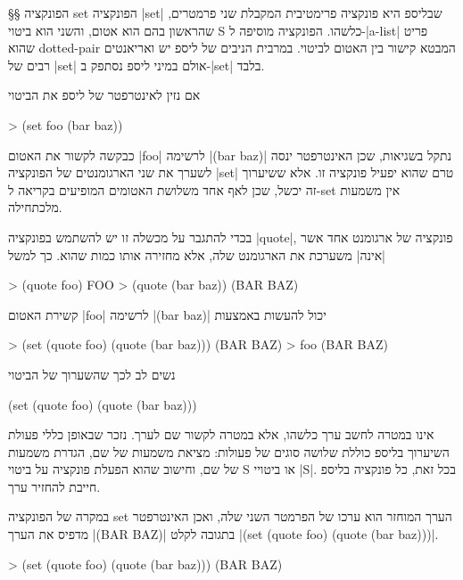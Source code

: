 §§ הפונקציה set
הפונקציה \T|set| שבליספ היא פונקציה פרימטיבית המקבלת שני פרמטרים, שהראשון בהם
הוא אטום, והשני הוא ביטוי S כלשהו. הפונקציה מוסיפה ל-\E|a-list| פריט שהוא
dotted-pair
המבטא קישור בין האטום לביטוי. במרבית הניבים של ליספ יש ואריאנטים רבים של
\T|set| אולם במיני ליספ נסתפק ב-\T|set| בלבד.

אם נזין לאינטרפטר של ליספ את הביטוי
\begin{LISP}
> (set foo (bar baz))
\end{LISP}
כבקשה לקשור את האטום \T|foo| לרשימה \T|(bar baz)|
נתקל בשגיאות, שכן האינטרפטר ינסה לשערך את שני הארגומנטים של הפונקציה \E|set|
טרם שהוא יפעיל פונקציה זו. אלא ששיערוך זה יכשל, שכן לאף אחד משלושת האטומים
המופיעים בקריאה ל-set אין משמעות מלכתחילה.

בכדי להתגבר על מכשלה זו יש להשתמש בפונקציה \T|quote|, פונקציה של ארגומנט אחד
אשר \ע|אינה| משערכת את הארגומנט שלה, אלא מחזירה אותו כמות שהוא.
כך למשל
\begin{LISP}
> (quote foo)
FOO
> (quote (bar baz))
(BAR BAZ)
\end{LISP}
קשירת האטום \T|foo| לרשימה \T|(bar baz)| יכול להעשות באמצעות
\begin{LISP}
> (set (quote foo) (quote (bar baz)))
(BAR BAZ)
> foo
(BAR BAZ)
\end{LISP}
נשים לב לכך שהשערוך של הביטוי
\begin{LISP}
(set (quote foo) (quote (bar baz)))
\end{LISP}
אינו במטרה לחשב ערך כלשהו, אלא במטרה לקשור שם לערך. נזכר שבאופן
כללי פעולת השיערוך בליספ כוללת שלושה סוגים של פעולות: מציאת משמעות של שם, הגדרת
משמעות של שם, וחישוב שהוא הפעלת פונקציה על ביטוי S או ביטויי \E|S|.
בכל זאת, כל פונקציה בליספ חייבת להחזיר ערך.

במקרה של הפונקציה set הערך המוחזר הוא ערכו של הפרמטר השני שלה, ואכן האינטרפטר
מדפיס את הערך \T|(BAR BAZ)| בתגובה לקלט \T|(set (quote foo) (quote (bar
baz)))|.

\begin{LISP}
> (set (quote foo) (quote (bar baz)))
(BAR BAZ)
\end{LISP}


